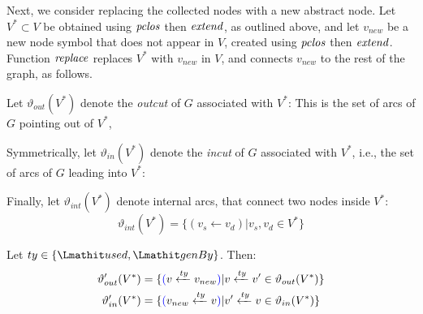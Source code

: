 Next, we consider replacing the collected nodes with a new abstract node.
%
Let $V^* \subset V$ be obtained using $\mathit{pclos}$ then $\mathit{extend}$, as outlined above, and let $v_{new}$ be a new node symbol that does not appear in $V$, created using $\mathit{pclos}$ then $\mathit{extend}$. 
Function $\mathit{replace}$ replaces $V^*$ with $v_{new}$ in $V$, and connects $v_{new}$ to the rest of the graph, as follows.

Let $\vartheta_{out}(V^*)$ denote the \textit{outcut} of $G$ associated with $V^*$:
\jwb{\[ \vartheta_{out}(V^*) = \{  (v_d \leftarrow v_s) |   v_s \in  V^*, v_d \in V \setminus V^*\}\]}
This is the set of arcs of $G$ pointing out of $V^*$,

Symmetrically, let $\vartheta_{in}(V^*)$ denote the \textit{incut}  of $G$ associated with $V^*$, i.e., the set of arcs of $G$ leading into $V^*$:
\jwb{\[ \vartheta_{in}(V^*) = \{  (v_d\leftarrow v_s) |  v_d \in V^*, v_s \in  V \setminus V^* \}\]}

Finally, let $\vartheta_{int}(V^*)$ denote internal arcs, that connect two nodes inside $V^*$:
\[ \vartheta_{int}(V^*) = \{  (v_s\leftarrow v_d) | v_s, v_d \in V^*\}\]


%


%

\begin{definition}
  Let $ty \in \{\used,  \wgby\}$. Then:
  \begin{align*}
\vartheta_{out}'(V^*) = \{ & \jwb{(}v \xleftarrow{ty}  v_{new} \jwb{)}|  v \xleftarrow{ty} v' \in \vartheta_{out}(V^*)  \}  \\
\vartheta_{in}'(V^*) = \{ & \jwb{(}v_{new} \xleftarrow{ty} v \jwb{)} | v' \xleftarrow{ty} v \in \vartheta_{in}(V^*)  \}   
\end{align*}
\label{def:eq:outcut}
\end{definition}

% 

